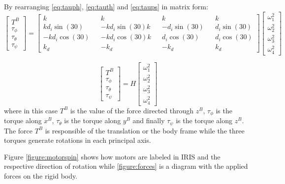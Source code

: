 \noindent
By rearranging \eqref{eq:tauph}, \eqref{eq:tauth} and \eqref{eq:taups} in matrix form:
\begin{equation}
\begin{bmatrix}
T^B\\\tau_\phi\\\tau_\theta\\\tau_\psi
\end{bmatrix} = \begin{bmatrix}
k&&k&&k&&k\\
k d_i \sin(30)&&-k d_i \sin(30)k&& -d_i \sin(30)&&d_i \sin(30)\\
-k d_i \cos(30)&&-k d_i \cos(30)k&& d_i \cos(30)&&d_i \cos(30)\\
k_d&&-k_d&&-k_d&&k_d
\end{bmatrix} \begin{bmatrix}
\omega_1^2\\\omega_2^2\\\omega_3^2\\\omega_4^2
\end{bmatrix}
\label{eq:inputmix}
\end{equation}

\begin{equation}
\begin{bmatrix}
T^B\\\tau_\phi\\\tau_\theta\\\tau_\psi
\end{bmatrix} = H \begin{bmatrix}
\omega_1^2\\\omega_2^2\\\omega_3^2\\\omega_4^2
\end{bmatrix}
\label{eq:inputmixmatrix}
\end{equation}
where in this case $T^B$ is the value of the force directed through $z^B$, $\tau_\phi$ is the torque along $x^B$, $\tau_\theta$ is the torque along $y^B$ and finally  $\tau_\psi$ is the torque along $z^B$. The force $T^B$ is responsible of the translation or the body frame while the three torques generate rotations in each principal axis.

Figure \ref{figure:motorspin} shows how motors are labeled in IRIS and the respective direction of rotation while \ref{figure:forces} is a diagram with the applied forces on the rigid body.

